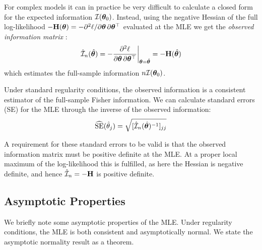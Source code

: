 For complex models it can in practice be very difficult to calculate a closed form for the expected information $\mathcal{I}(\bm{\theta}_0)$. Instead, using the negative Hessian of the full log-likelihood $-\mathbf{H}(\bm{\theta}) = -\partial^2 \ell / \partial\bm{\theta}\,\partial\bm{\theta}^\top$ evaluated at the MLE we get the \emph{observed information matrix} \parencite[Sec.~10.1.3, p.~473]{Casella2002}:
\begin{equation}
\label{eq:observed_info}
    \hat{\mathcal{I}}_n(\hat{\bm{\theta}}) = -\frac{\partial^2 \ell}{\partial\bm{\theta}\,\partial\bm{\theta}^\top} \bigg|_{\bm{\theta}=\hat{\bm{\theta}}} = -\mathbf{H}(\hat{\bm{\theta}})
\end{equation}
which estimates the full-sample information $n\mathcal{I}(\bm{\theta}_0)$.

Under standard regularity conditions, the observed information is a consistent estimator of the full-sample Fisher information. We can calculate standard errors (SE) for the MLE through the inverse of the observed information:
\begin{equation}
\label{eq:mle_se}
    \widehat{\text{SE}}(\hat{\theta}_j) = \sqrt{[\hat{\mathcal{I}}_n(\hat{\bm{\theta}})^{-1}]_{jj}}
\end{equation}

A requirement for these standard errors to be valid is that the observed information matrix must be positive definite at the MLE\@. At a proper local maximum of the log-likelihood this is fulfilled, as here the Hessian is negative definite, and hence $\hat{\mathcal{I}}_n = -\mathbf{H}$ is positive definite.

\subsection{Asymptotic Properties}

We briefly note some asymptotic properties of the MLE\@. Under regularity conditions, the MLE is both consistent and asymptotically normal. We state the asymptotic normality result as a theorem.

